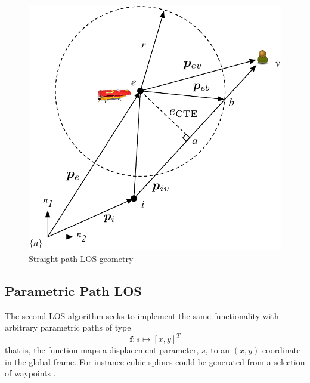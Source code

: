 \documentclass[conference]{IEEEtran}
\begin{document}
\begin{figure}[h]
  \centering
  \includegraphics[scale=0.55]{figs/los.pdf}
  \caption{Straight path LOS geometry}
  \label{fig:los}
\end{figure}

\subsection{Parametric Path LOS} %
\label{sub:parametric_path_los}

The second LOS algorithm seeks to implement the same functionality with arbitrary parametric paths of type
\begin{equation}
  \bm{f}: s \mapsto [x, y]^T
\end{equation}
that is, the function maps a displacement parameter, $s$, to an $(x, y)$ coordinate in the global frame. For instance cubic splines could be generated from a selection of waypoints \cite{de1978practical}.
\end{document}
